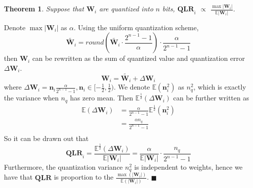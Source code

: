 \documentclass[letterpaper]{article} %
\newtheorem{theorem}{Theorem}
\newenvironment{proof}{{\noindent\it Proof}\quad}{\hfill $\blacksquare$\par}
\begin{document}
\begin{theorem}\label{the:range-mean}
	Suppose that $\mathbf{W}_{i}$ are quantized into $n$ bits, $\mathbf{QLR}_{i}$ $\propto$ $\frac{\max|\mathbf{W}_i|}{\mathbb{E}{|\mathbf{W}_{i}|}}$.
\end{theorem}
\begin{proof}
	Denote $\max|\mathbf{W}_i|$ as $\alpha$. Using the uniform quantization scheme,
	\begin{equation}
    \tilde{\mathbf{W}_{i}}=round(\tilde{\mathbf{W}_{i}} \cdot \frac{2^{n-1}-1}{\alpha}) \cdot \frac{\alpha}{2^{n-1}-1}
	\end{equation}
then $\mathbf{W}_i$ can be rewritten as the sum of quantized value and quantization error $\Delta \mathbf{W}_{i}$.
	\begin{equation}
	\mathbf{W}_{i}=\tilde{\mathbf{W}_{i}}+\Delta \mathbf{W}_{i}
	\end{equation}
	where $\Delta \mathbf{W}_{i} = \mathbf{n}_{i}\frac{\alpha}{2^{n-1}-1}, \mathbf{n}_{i} \in [-\frac{1}{2},\frac{1}{2})$. We denote $\mathbb{E}(\mathbf{n}^2_{i})$ as $n^2_q$, which is exactly the variance when $n_q$ has zero mean. Then $\mathbb{E}^{\frac{1}{2}}(\Delta \mathbf{W}_{i})$ can be further written as
	\begin{equation}
	\begin{aligned}
	\mathbb{E}(\Delta \mathbf{W}_{i})
	&=\frac{\alpha}{2^{n-1}-1}\mathbb{E}^{\frac{1}{2}}(\mathbf{n}_{i}^2) \\
	&=\frac{\alpha n_{q}}{2^{n-1}-1} \\
	\end{aligned}
	\end{equation}
So it can be drawn out that
	\begin{equation}
	\mathbf{QLR}_{i} = \frac{\mathbb{E}^{\frac{1}{2}}(\Delta \mathbf{W}_{i})}{\mathbb{E}|\mathbf{W}_i|} = \frac{\alpha}{\mathbb{E}|\mathbf{W}_i|} \cdot \frac{ n_{q}}{2^{n-1}-1}
	\end{equation}
	Furthermore, the quantization variance $n_q^2$ is independent to weights,
	hence we have that $\mathbf{QLR}$ is proportion to the $\frac{\max(|\mathbf{W}_i|)}{\mathbb{E}(|\mathbf{W}_{i}|)}$.
\end{proof}
\end{document}
